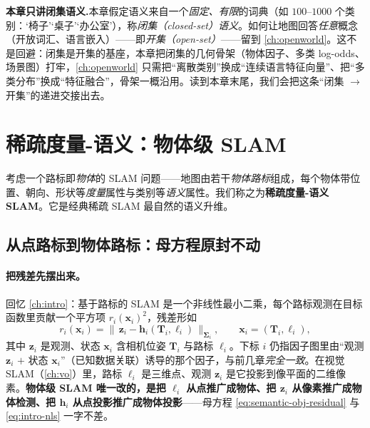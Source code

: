 \begin{note}
\textbf{本章只讲闭集语义.}\;本章假定语义来自一个\emph{固定、有限}的词典（如 $100$–$1000$ 个类别：‘椅子’‘桌子’‘办公室’），称\emph{闭集（closed-set）语义}\cite{carlone2026handbook}。如何让地图回答\emph{任意}概念（开放词汇、语言嵌入）——即\emph{开集（open-set）}——留到 \cref{ch:openworld}。这不是回避：闭集是开集的基座，本章把闭集的几何骨架（物体因子、多类 log-odds、场景图）打牢，\cref{ch:openworld} 只需把“离散类别”换成“连续语言特征向量”、把“多类分布”换成“特征融合”，骨架一概沿用。读到本章末尾，我们会把这条“闭集 $\to$ 开集”的递进交接出去。
\end{note}

\section{稀疏度量-语义：物体级 SLAM}
\label{sec:semantic-object}

考虑一个路标即\emph{物体}的 SLAM 问题——地图由若干\emph{物体路标}组成，每个物体带位置、朝向、形状等\emph{度量}属性与类别等\emph{语义}属性。我们称之为\textbf{稀疏度量-语义 SLAM}\cite{carlone2026handbook}。它是经典稀疏 SLAM 最自然的语义升维。

\subsection{从点路标到物体路标：母方程原封不动}
\label{sec:semantic-object-def}

\paragraph{把残差先摆出来。}
回忆 \cref{ch:intro}：基于路标的 SLAM 是一个非线性最小二乘，每个路标观测在目标函数里贡献一个平方项 $r_i(\mathbf{x}_i)^2$，残差形如
\begin{equation}
  r_i(\mathbf{x}_i)=\big\|\,\mathbf{z}_i-\mathbf{h}_i(\mathbf{T}_i,\boldsymbol\ell_i)\,\big\|_{\boldsymbol\Sigma_i},
  \qquad \mathbf{x}_i=(\mathbf{T}_i,\boldsymbol\ell_i),
  \label{eq:semantic-obj-residual}
\end{equation}
其中 $\mathbf{z}_i$ 是观测、状态 $\mathbf{x}_i$ 含相机位姿 $\mathbf{T}_i$ 与路标 $\boldsymbol\ell_i$\cite{carlone2026handbook}。下标 $i$ 仍指因子图里由“观测 $\mathbf{z}_i$ $+$ 状态 $\mathbf{x}_i$”（已知数据关联）诱导的那个因子，与前几章\emph{完全一致}。在视觉 SLAM（\cref{ch:vo}）里，路标 $\boldsymbol\ell_i$ 是三维点、观测 $\mathbf{z}_i$ 是它投影到像平面的二维像素。\textbf{物体级 SLAM 唯一改的，是把 $\boldsymbol\ell_i$ 从点推广成物体、把 $\mathbf{z}_i$ 从像素推广成物体检测、把 $\mathbf{h}_i$ 从点投影推广成物体投影}——母方程 \cref{eq:semantic-obj-residual} 与 \cref{eq:intro-nls} 一字不差。


